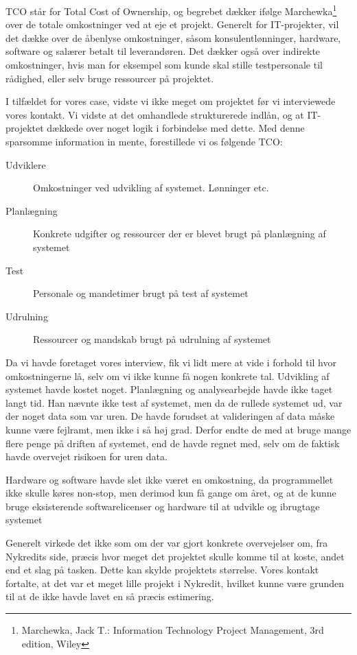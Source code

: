 TCO står for Total Cost of Ownership, og begrebet dækker ifølge
Marchewka\footnote{Marchewka, Jack T.: Information Technology Project
Management, 3rd edition, Wiley} over de totale omkostninger ved at eje et
projekt. Generelt for IT-projekter, vil det dække over de åbenlyse omkostninger,
såsom konsulentlønninger, hardware, software og salærer betalt til leverandøren.
Det dækker også over indirekte omkostninger, hvis man for eksempel som kunde
skal stille testpersonale til rådighed, eller selv bruge ressourcer på
projektet.

I tilfældet for vores case, vidste vi ikke meget om projektet før vi
interviewede vores kontakt. Vi vidste at det omhandlede strukturerede indlån, og
at IT-projektet dækkede over noget logik i forbindelse med dette. Med denne
sparsomme information in mente, forestillede vi os følgende TCO:

\begin{description}
  \item[Udviklere]
  Omkostninger ved udvikling af systemet. Lønninger etc.
  \item[Planlægning]
  Konkrete udgifter og ressourcer der er blevet brugt på planlægning af systemet
  \item[Test]
  Personale og mandetimer brugt på test af systemet
  \item[Udrulning]
  Ressourcer og mandskab brugt på udrulning af systemet
\end{description}

Da vi havde foretaget vores interview, fik vi lidt mere at vide i forhold til
hvor omkostningerne lå, selv om vi ikke kunne få nogen konkrete tal. Udvikling
af systemet havde kostet noget. Planlægning og analysearbejde havde ikke taget
langt tid. Han nævnte ikke test af systemet, men da de rullede systemet ud, var
der noget data som var uren. De havde forudset at valideringen af data måske
kunne være fejlramt, men ikke i så høj grad. Derfor endte de med at bruge mange
flere penge på driften af systemet, end de havde regnet med, selv om de faktisk
havde overvejet risikoen for uren data.

Hardware og software havde slet ikke været en omkostning, da programmellet ikke
skulle køres non-stop, men derimod kun få gange om året, og at de kunne bruge
eksisterende softwarelicenser og hardware til at udvikle og ibrugtage systemet

Generelt virkede det ikke som om der var gjort konkrete overvejelser om, fra
Nykredits side, præcis hvor meget det projektet skulle komme til at koste, andet
end et slag på tasken.  Dette kan skylde projektets størrelse. Vores kontakt
fortalte, at det var et meget lille projekt i Nykredit, hvilket kunne være
grunden til at de ikke havde lavet en så præcis estimering.
